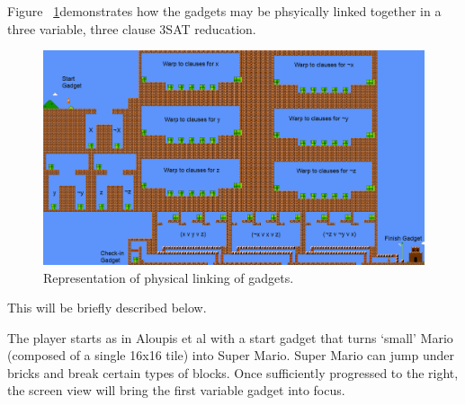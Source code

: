 \documentclass[11pt, a4paper, oneside]{report} %
\begin{document}





Figure ~\ref{full-level}demonstrates how the gadgets may be phsyically linked
together in a three variable, three clause 3SAT reducation.

\begin{figure}[ht!]

  \centering
    \includegraphics[scale=0.25]{fulllevel-text}
  \caption{Representation of physical linking of gadgets.}
  \label{full-level}
\end{figure}

This will be briefly described below. 

The player starts as in Aloupis et al \cite{Aloupis2012} with a start gadget
that turns `small' Mario (composed of a single 16x16 tile) into Super Mario.
Super Mario can jump under bricks and break certain types of blocks. Once
sufficiently progressed to the right, the screen view will bring the first
variable gadget into focus.
\end{document}
